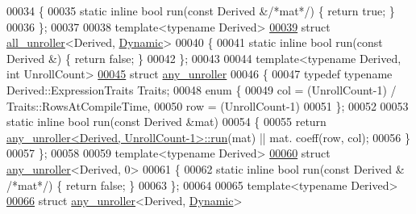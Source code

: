 \begin{DoxyCode}
00034 \{
00035   \textcolor{keyword}{static} \textcolor{keyword}{inline} \textcolor{keywordtype}{bool} run(\textcolor{keyword}{const} Derived &\textcolor{comment}{/*mat*/}) \{ \textcolor{keywordflow}{return} \textcolor{keyword}{true}; \}
00036 \};
00037 
00038 \textcolor{keyword}{template}<\textcolor{keyword}{typename} Derived>
\hyperlink{struct_eigen_1_1internal_1_1all__unroller_3_01_derived_00_01_dynamic_01_4}{00039} \textcolor{keyword}{struct }\hyperlink{struct_eigen_1_1internal_1_1all__unroller}{all\_unroller}<Derived, \hyperlink{namespace_eigen_ad81fa7195215a0ce30017dfac309f0b2}{Dynamic}>
00040 \{
00041   \textcolor{keyword}{static} \textcolor{keyword}{inline} \textcolor{keywordtype}{bool} run(\textcolor{keyword}{const} Derived &) \{ \textcolor{keywordflow}{return} \textcolor{keyword}{false}; \}
00042 \};
00043 
00044 \textcolor{keyword}{template}<\textcolor{keyword}{typename} Derived, \textcolor{keywordtype}{int} UnrollCount>
\hyperlink{struct_eigen_1_1internal_1_1any__unroller}{00045} \textcolor{keyword}{struct }\hyperlink{struct_eigen_1_1internal_1_1any__unroller}{any\_unroller}
00046 \{
00047   \textcolor{keyword}{typedef} \textcolor{keyword}{typename} Derived::ExpressionTraits Traits;
00048   \textcolor{keyword}{enum} \{
00049     col = (UnrollCount-1) / Traits::RowsAtCompileTime,
00050     row = (UnrollCount-1) %
00051   \};
00052   
00053   \textcolor{keyword}{static} \textcolor{keyword}{inline} \textcolor{keywordtype}{bool} run(\textcolor{keyword}{const} Derived &mat)
00054   \{
00055     \textcolor{keywordflow}{return} \hyperlink{struct_eigen_1_1internal_1_1any__unroller}{any\_unroller<Derived, UnrollCount-1>::run}(mat) || mat.
      coeff(row, col);
00056   \}
00057 \};
00058 
00059 \textcolor{keyword}{template}<\textcolor{keyword}{typename} Derived>
\hyperlink{struct_eigen_1_1internal_1_1any__unroller_3_01_derived_00_010_01_4}{00060} \textcolor{keyword}{struct }\hyperlink{struct_eigen_1_1internal_1_1any__unroller}{any\_unroller}<Derived, 0>
00061 \{
00062   \textcolor{keyword}{static} \textcolor{keyword}{inline} \textcolor{keywordtype}{bool} run(\textcolor{keyword}{const} Derived & \textcolor{comment}{/*mat*/}) \{ \textcolor{keywordflow}{return} \textcolor{keyword}{false}; \}
00063 \};
00064 
00065 \textcolor{keyword}{template}<\textcolor{keyword}{typename} Derived>
\hyperlink{struct_eigen_1_1internal_1_1any__unroller_3_01_derived_00_01_dynamic_01_4}{00066} \textcolor{keyword}{struct }\hyperlink{struct_eigen_1_1internal_1_1any__unroller}{any\_unroller}<Derived, \hyperlink{namespace_eigen_ad81fa7195215a0ce30017dfac309f0b2}{Dynamic}>

\end{DoxyCode}
